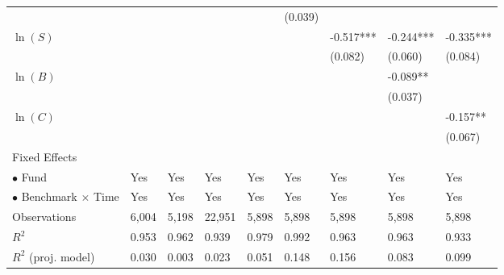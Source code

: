 \documentclass[openany]{book}
\theoremstyle{definition}
\theoremstyle{definition}
\theoremstyle{definition}
\theoremstyle{remark}
\begin{document}
\begin{table}[ht]
\begin{tabularx}{0.975\textwidth}{lYYYYYYYY}
   &  &  &  &  & (0.039) &  &  &  \\ 
  $\ln(S)$ &  &  &  &  &  & -0.517*** & -0.244*** & -0.335*** \\ 
   &  &  &  &  &  & (0.082) & (0.060) & (0.084) \\ 
  $\ln(B)$ &  &  &  &  &  &  & -0.089** &  \\ 
   &  &  &  &  &  &  & (0.037) &  \\ 
  $\ln(C)$ &  &  &  &  &  &  &  & -0.157** \\ 
   &  &  &  &  &  &  &  & (0.067) \\ 
  Fixed Effects &  &  &  &  &  &  &  &  \\ 
  $\bullet$ Fund & Yes & Yes & Yes & Yes & Yes & Yes & Yes & Yes \\ 
  $\bullet$ Benchmark $\times$ Time & Yes & Yes & Yes & Yes & Yes & Yes & Yes & Yes \\ 
  Observations & 6,004 & 5,198 & 22,951 & 5,898 & 5,898 & 5,898 & 5,898 & 5,898 \\ 
  $R^2$ & 0.953 & 0.962 & 0.939 & 0.979 & 0.992 & 0.963 & 0.963 & 0.933 \\ 
  $R^2$ (proj. model) & 0.030 & 0.003 & 0.023 & 0.051 & 0.148 & 0.156 & 0.083 & 0.099 \\ 
   \bottomrule
\end{tabularx}
\endgroup
\end{table}
\end{document}
